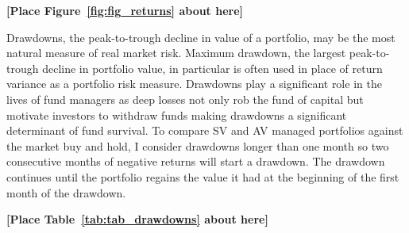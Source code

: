 \bigskip
\centerline{\bf [Place Figure~\ref{fig:fig_returns} about here]}
\bigskip

Drawdowns, the peak-to-trough decline in value of a portfolio, may be the most natural measure of real market risk. \citep{magdon-ismail_maximum_2006} Maximum drawdown, the largest peak-to-trough decline in portfolio value, in particular is often used in place of return variance as a portfolio risk measure. \citep{johansen_large_2000,articlev1,articlev2,noauthor_sornette_nodate} Drawdowns play a significant role in the lives of fund managers as deep losses not only rob the fund of capital but motivate investors to withdraw funds making drawdowns a significant determinant of fund survival. \citep{baba_hedge_nodate,papaioannou_procyclical_2013,lang_2006} To compare SV and AV managed portfolios against the market buy and hold, I consider drawdowns longer than one month so two consecutive months of negative returns will start a drawdown. The drawdown continues until the portfolio regains the value it had at the beginning of the first month of the drawdown. 

\bigskip
\centerline{\bf [Place Table~\ref{tab:tab_drawdowns} about here]}
\bigskip

